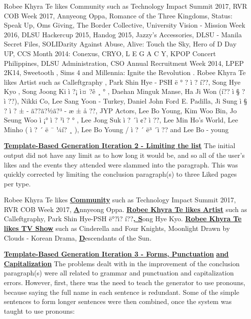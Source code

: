 \begin{center} Robee Khyra Te likes Community such as Technology Impact Summit 2017, RVR COB Week 2017, Annyeong Oppa, Romance of the Three Kingdoms, Status: Speak Up, Oms Giving, The Border Collective, University Vision - Mission Week 2016, DLSU Hackercup 2015, Handog 2015, Jazzy's Accessories, DLSU - Manila Secret Files, SOLIDarity Against Abuse, Alive: Touch the Sky, Hero of D Day UP, CCS Month 2014: Conexus, CRYO, L E G A C Y, KPOP Concert Philippines, DLSU Administration, CSO Annual Recruitment Week 2014, LPEP 2K14, Sweetooth , Sims 4 and Millennia: Ignite the Revolution . Robee Khyra Te likes Artist such as Calleftgraphy , Park Shin Hye - PSH ë ° ? ì ? í??, Song Hye Kyo , Song Joong Ki ì ?¡ ì¤ ?ê ¸ ° , Daehan Minguk Manse, Ha Ji Won (í?? ì § ? ì ??), Nikki Co, Lee Sang Yoon - Turkey, Daniel John Ford E. Padilla, Ji Sung ì § ? ì ? ± - ã??ã?½ã?³ - æ ± å ??, JYP Actors, Lee Bo Young, Kim Woo Bin, Jo Seung Woo ì ¡° ì ? ¹ì ? ° , Lee Jong Suk ì ? ´ì ¢? ì ??, Lee Min Ho's World, Lee Minho ( ì ? ´ ë ¯ ¼í? ¸ ), Lee Bo Young / ì ? ´ ë³ ´ì ?? and Lee Bo - young
\end{center}

\underline{\textbf{Template-Based Generation Iteration 2 - Limiting the list}} \newline
The initial output did not have any limit as to how long it would be, and so all of the user’s likes and the events they attended were slammed into the paragraph. This was quickly corrected by limiting the conclusion paragraph(s) to three Liked pages per type.

\begin{center} Robee Khyra Te likes \underline{\textbf{Community}} such as Technology Impact Summit 2017, RVR COB Week 2017, \underline{\textbf{A}}nnyeong Oppa. \newline
	\underline{\textbf{Robee Khyra Te likes Artist}} such as Calleftgraphy, Park Shin Hye-PSH ë°?ì? í??\underline{\textbf{, S}}ong Hye Kyo. \newline
	\underline{\textbf{Robee Khyra Te likes TV Show}} such as Cinderella and Four Knights, Moonlight Drawn by Clouds - Korean Drama, \underline{\textbf{D}}escendants of the Sun. \end{center}

\underline{\textbf{Template-Based Generation Iteration 3 - Forms, Punctuation}} \newline \underline{\textbf{and Capitalization}} 
\newline
The problems dealt with in the improvement of the conclusion paragraph(s) were all related to grammar and punctuation and capitalization errors. However, first, there was the need to teach the generator to use pronouns, because saying the full name in each sentence is redundant. Some of the simple sentences to form longer sentences were then combined, once the system was taught to use pronouns:

